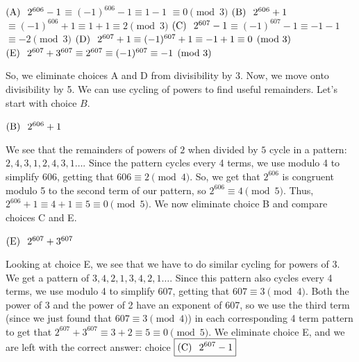 \begin{enumerate}
 


 $(\text{A})\hspace{0.1in} 2^{606}-1$$\equiv (-1)^{606} -1$$\equiv 1-1$ $\equiv 0 \pmod{3}$
$(\text{B}) \hspace{0.1in} 2^{606}+1$$\equiv (-1)^{606} +1$$\equiv 1+1$$\equiv 2 \pmod{3}$
$(\text{C})\hspace{0.1in} 2^{607}-1$$\equiv (-1)^{607} -1$$\equiv -1 - 1$$\equiv -2 \pmod{3}$
$(\text{D})\hspace{0.1in} 2^{607} +1 \equiv (-1)^{607} +1 \equiv -1+1 \equiv 0 \pmod{3}$
$(\text{E}) \hspace{0.1in}  2^{607} + 3^{607} \equiv 2^{607} \equiv (-1)^{607} \equiv -1 \pmod{3}$

 
So, we eliminate choices A and D from divisibility by 3. Now, we move onto divisibility by 5. We can use cycling of powers to find useful remainders. Let's start with choice $B$. 

 


 $(\text{B}) \hspace{0.1in} 2^{606}+1$ 

 


 We see that the remainders of powers of $2$ when divided by $5$ cycle in a pattern: $2,4,3,1,2,4,3,1 \dots$. Since the pattern cycles every 4 terms, we use modulo 4 to simplify 606, getting that $606 \equiv 2\pmod{4}$. So, we get that $2^{606}$ is congruent modulo 5 to the second term of our pattern, so $2^{606} \equiv{4} \pmod{5}$. Thus, $2^{606}+1 \equiv 4+1 \equiv 5\equiv 0\pmod{5}$. We now eliminate choice B and compare choices C and E.  

 
$(\text{E}) \hspace{0.1in} 2^{607} + 3^{607}$ 

 


 
Looking at choice E, we see that we have to do similar cycling for powers of $3$. We get a pattern of $3,4,2,1,3,4,2,1 \dots$. Since this pattern also cycles every 4 terms, we use modulo 4 to simplify 607, getting that $607 \equiv 3\pmod{4}$. Both the power of 3 and the power of 2 have an exponent of 607, so we use the third term (since we just found that $607 \equiv 3\pmod{4}$) in each corresponding 4 term pattern to get that $2^{607} + 3^{607} \equiv 3+2 \equiv 5 \equiv 0\pmod{5}$. We eliminate choice E, and we are left with the correct answer: choice $\boxed{(\text{C}) \hspace{0.1in} 2^{607}-1}$





\end{enumerate}
